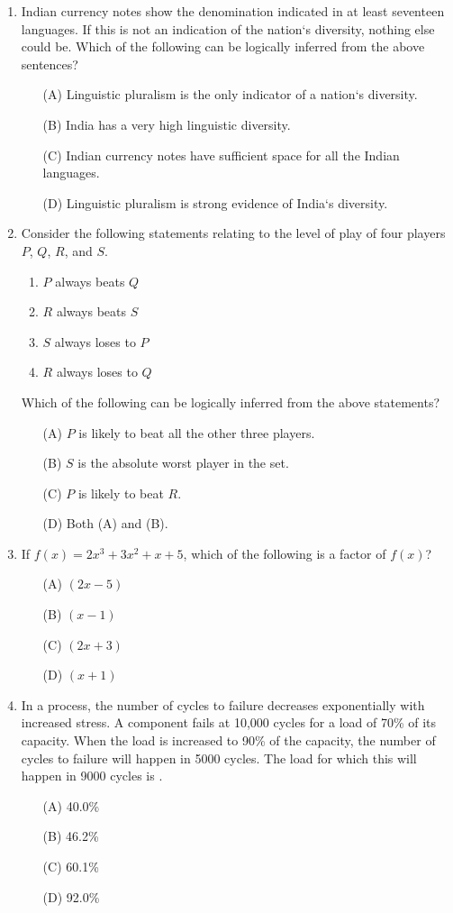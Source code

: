 \documentclass[journal,12pt,onecolumn]{IEEEtran}
\theoremstyle{remark}
\begin{document}
\begin{enumerate}
\item Indian currency notes show the denomination indicated in at least seventeen languages. If this is not an indication of the nation`s diversity, nothing else could be. Which of the following can be logically inferred from the above sentences?
\begin{enumerate}
    \item[(A)] Linguistic pluralism is the only indicator of a nation`s diversity.
    \item[(B)] India has a very high linguistic diversity.
    \item[(C)] Indian currency notes have sufficient space for all the Indian languages.
    \item[(D)] Linguistic pluralism is strong evidence of India`s diversity.
\end{enumerate}
\item Consider the following statements relating to the level of play of four players $P$, $Q$, $R$, and $S$.
\begin{enumerate}
    \item $P$ always beats $Q$
    \item $R$ always beats $S$
    \item $S$ always loses to $P$
    \item $R$ always loses to $Q$
\end{enumerate}
Which of the following can be logically inferred from the above statements?
\begin{enumerate}
    \item[(A)] $P$ is likely to beat all the other three players.
    \item[(B)] $S$ is the absolute worst player in the set.
    \item[(C)] $P$ is likely to beat $R$.
    \item[(D)] Both (A) and (B).
\end{enumerate}
\item If $f(x) = 2x^3 + 3x^2 + x + 5$, which of the following is a factor of $f(x)$?
\begin{enumerate}
    \item[(A)] $(2x - 5)$
    \item[(B)] $(x - 1)$
    \item[(C)] $(2x + 3)$
    \item[(D)] $(x + 1)$
\end{enumerate}
\item In a process, the number of cycles to failure decreases exponentially with increased stress. A component fails at 10,000 cycles for a load of 70\% of its capacity. When the load is increased to 90\% of the capacity, the number of cycles to failure will happen in 5000 cycles. The load for which this will happen in 9000 cycles is .
\begin{enumerate}
    \item[(A)] 40.0\%
    \item[(B)] 46.2\%
    \item[(C)] 60.1\%
    \item[(D)] 92.0\%
\end{enumerate}


\end{enumerate}
\end{document}
